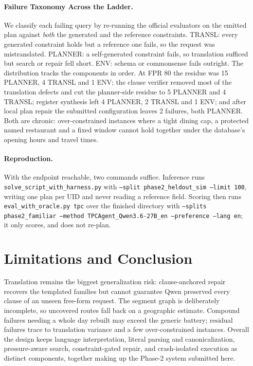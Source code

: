 \documentclass{article}
\begin{document}
\paragraph{Failure Taxonomy Across the Ladder.}
We classify each failing query by re-running the official evaluators on the
emitted plan against \emph{both} the generated and the reference
constraints. TRANSL: every generated constraint holds but a reference one
fails, so the request was mistranslated. PLANNER: a self-generated
constraint fails, so translation sufficed but search or repair fell short.
ENV: schema or commonsense fails outright. The distribution tracks the
components in order. At FPR 80 the residue was 15 PLANNER, 4 TRANSL and
1 ENV; the clause verifier removed most of the translation defects and cut
the planner-side residue to 5 PLANNER and 4 TRANSL; register synthesis left
4 PLANNER, 2 TRANSL and 1 ENV; and after local plan repair the submitted
configuration leaves 2 failures, both PLANNER. Both are chronic: over-constrained instances where a tight dining cap, a
protected named restaurant and a fixed window cannot hold together under
the database's opening hours and travel times.

\paragraph{Reproduction.}
With the endpoint reachable, two commands suffice. Inference runs
\texttt{solve\_script\_with\_harness.py} with
\texttt{--split phase2\_heldout\_sim --limit 100}, writing one plan per UID
and never reading a reference field. Scoring then runs
\texttt{eval\_with\_oracle.py tpc} over the finished directory with
\texttt{--splits phase2\_familiar --method TPCAgent\_Qwen3.6-27B\_en
--preference --lang en}; it only scores, and does not re-plan.

\section{Limitations and Conclusion}
 
Translation remains the biggest generalization risk: clause-anchored repair
recovers the templated families but cannot guarantee Qwen preserved every
clause of an unseen free-form request. The segment graph is deliberately
incomplete, so uncovered routes fall back on a geographic estimate. Compound failures needing a whole day rebuilt may exceed the generic
battery; residual failures trace to translation variance and a few
over-constrained instances. Overall the design keeps language interpretation, literal parsing and
canonicalization, pressure-aware search, constraint-gated repair, and
crash-isolated execution as distinct components, together making up the
Phase-2 system submitted here.
 
\end{document}
